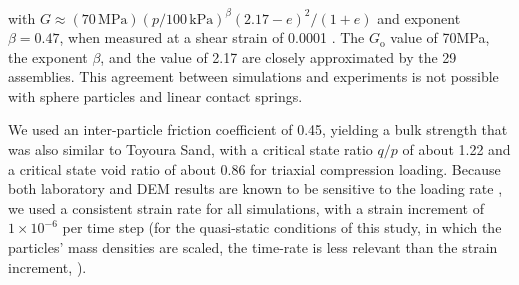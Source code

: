 \documentclass[letterpaper,11pt]{article}
\begin{document}
with $G\approx (70\,\text{MPa})(p / 100\,\text{kPa})^{\beta}(2.17-e)^{2}/(1+e)$
and exponent $\beta=0.47$,
when measured at a shear strain of 0.0001 \citep{Hardin:1963a,Iwasaki:1978a}.
The $G_{\text{o}}$ value of 70MPa, the exponent $\beta$,
and the value of 2.17 are
closely approximated by the 29 assemblies.
This agreement between simulations and experiments is not
possible with sphere particles and linear contact springs.
\par
We used an inter-particle friction coefficient of 0.45, 
yielding a bulk strength that was also
similar to Toyoura Sand, 
with a critical state ratio $q/p$ of about 1.22 and a critical
state void ratio of about 0.86 for triaxial
compression loading.
Because both laboratory and DEM results are known
to be sensitive to the loading rate \citep{Hanley:2013a},
we used a consistent strain rate for
all simulations,
with a strain increment of $1\times 10^{-6}$
per time step
(for the quasi-static conditions of this study, in which the particles'
mass densities are scaled, the time-rate is less relevant than the strain
increment, \cite{Suzuki:2014a}).
%
%
\end{document}
